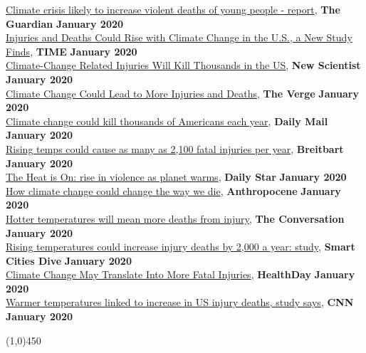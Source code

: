 \href{https://www.theguardian.com/environment/2020/jan/13/climate-crisis-likely-to-increase-violent-deaths-of-young-people-report}{Climate crisis likely to increase violent deaths of young people - report}, \textbf{The Guardian} \hfill \textbf{January 2020} \\
\href{https://time.com/5764673/injuries-deaths-climate-change/}{Injuries and Deaths Could Rise with Climate Change in the U.S., a New Study Finds}, \textbf{TIME} \hfill \textbf{January 2020} \\
\href{https://www.newscientist.com/article/2229627-climate-change-related-injuries-will-kill-thousands-in-the-us/}{Climate-Change Related Injuries Will Kill Thousands in the US}, \textbf{New Scientist} \hfill \textbf{January 2020} \\
\href{https://www.theverge.com/2020/1/13/21063690/climate-change-injuries-deaths-weather-violence-drowning-accidents}{Climate Change Could Lead to More Injuries and Deaths}, \textbf{The Verge} \hfill \textbf{January 2020} \\
\href{https://www.dailymail.co.uk/health/article-7882007/Global-temperatures-rising-just-3-degrees-lead-2-100-Americans-dying-year.html}{Climate change could kill thousands of Americans each year}, \textbf{Daily Mail} \hfill \textbf{January 2020} \\
\href{https://www.breitbart.com/news/rising-temps-could-cause-as-many-as-2100-fatal-injuries-per-year/}{Rising temps could cause as many as 2,100 fatal injuries per year}, \textbf{Breitbart} \hfill \textbf{January 2020} \\
\href{}{The Heat is On: rise in violence as planet warms}, \textbf{Daily Star} \hfill \textbf{January 2020} \\
\href{http://www.anthropocenemagazine.org/2020/01/how-climate-change-could-change-way-we-die/}{How climate change could change the way we die}, \textbf{Anthropocene} \hfill \textbf{January 2020} \\
\href{https://theconversation.com/car-accidents-drownings-violence-hotter-temperatures-will-mean-more-deaths-from-injury-129628}{Hotter temperatures will mean more deaths from injury}, \textbf{The Conversation} \hfill \textbf{January 2020} \\
\href{https://www.smartcitiesdive.com/news/rising-temperatures-could-increase-injury-deaths-by-2000-a-year-study/570457/}{Rising temperatures could increase injury deaths by 2,000 a year: study}, \textbf{Smart Cities Dive} \hfill \textbf{January 2020} \\
\href{https://consumer.healthday.com/diseases-and-conditions-information-37/heat-and-sunstroke-health-news-370/climate-change-may-translate-into-more-fatal-injuries-753852.html}{Climate Change May Translate Into More Fatal Injuries}, \textbf{HealthDay} \hfill \textbf{January 2020} \\
\href{https://www.cnn.com/2020/01/13/health/warm-temperatures-injury-deaths-study/index.html}{Warmer temperatures linked to increase in US injury deaths, study says}, \textbf{CNN} \hfill \textbf{January 2020}


\begin{center} \line(1,0){450} \end{center}